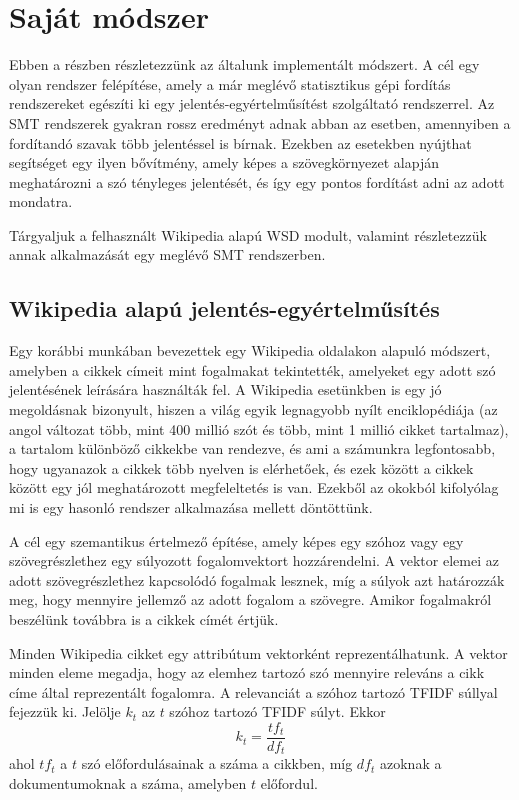 \section{Saját módszer} \label{sec:new_method}

Ebben a részben részletezzünk az általunk implementált módszert. A cél egy olyan rendszer felépítése, amely a már meglévő statisztikus gépi fordítás rendszereket egészíti ki egy jelentés-egyértelműsítést szolgáltató rendszerrel. Az SMT rendszerek gyakran rossz eredményt adnak abban az esetben, amennyiben a fordítandó szavak több jelentéssel is bírnak. Ezekben az esetekben nyújthat segítséget egy ilyen bővítmény, amely képes a szövegkörnyezet alapján meghatározni a szó tényleges jelentését, és így egy pontos fordítást adni az adott mondatra. 

Tárgyaljuk a felhasznált Wikipedia alapú WSD modult, valamint részletezzük annak alkalmazását egy meglévő SMT rendszerben.

\subsection{Wikipedia alapú jelentés-egyértelműsítés} \label{sec:WikiWSD}

Egy korábbi munkában \cite{Gabrilovich:2007:CSR} bevezettek egy Wikipedia oldalakon alapuló módszert, amelyben a cikkek címeit mint fogalmakat tekintették, amelyeket egy adott szó jelentésének leírására használták fel. A Wikipedia esetünkben is egy jó megoldásnak bizonyult, hiszen a világ egyik legnagyobb nyílt enciklopédiája (az angol változat több, mint 400 millió szót és több, mint 1 millió cikket tartalmaz), a tartalom különböző cikkekbe van rendezve, és ami a számunkra legfontosabb, hogy ugyanazok a cikkek több nyelven is elérhetőek, és ezek között a cikkek között egy jól meghatározott megfeleltetés is van. Ezekből az okokból kifolyólag mi is egy hasonló rendszer alkalmazása mellett döntöttünk.

A cél egy szemantikus értelmező építése, amely képes egy szóhoz vagy egy szövegrészlethez egy súlyozott fogalomvektort hozzárendelni. A vektor elemei az adott szövegrészlethez kapcsolódó fogalmak lesznek, míg a súlyok azt határozzák meg, hogy mennyire jellemző az adott fogalom a szövegre. Amikor fogalmakról beszélünk továbbra is a cikkek címét értjük. 

Minden Wikipedia cikket egy attribútum vektorként reprezentálhatunk. A vektor minden eleme megadja, hogy az elemhez tartozó szó mennyire releváns a cikk címe által reprezentált fogalomra. A relevanciát a szóhoz tartozó TFIDF súllyal fejezzük ki. Jelölje $k_t$ az $t$ szóhoz tartozó TFIDF súlyt. Ekkor 
\begin{equation}
	k_t = \frac{tf_t}{df_t}
\end{equation}
ahol $tf_t$ a $t$ szó előfordulásainak a száma a cikkben, míg $df_t$ azoknak a dokumentumoknak a száma, amelyben $t$ előfordul.

